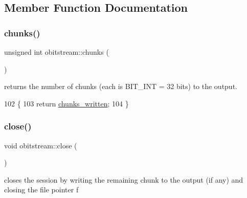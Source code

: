\subsection{Member Function Documentation}
\mbox{\label{classobitstream_ae835de27953b678b5b4ce5b33033d529}} 
\subsubsection{\texorpdfstring{chunks()}{chunks()}}
{\footnotesize\ttfamily unsigned int obitstream\+::chunks (\begin{DoxyParamCaption}{ }\end{DoxyParamCaption})\hspace{0.3cm}{\ttfamily [inline]}}



returns the number of chunks (each is B\+I\+T\+\_\+\+I\+NT = 32 bits) to the output. 


\begin{DoxyCode}
102                        \{
103     \textcolor{keywordflow}{return} \hyperlink{classobitstream_a3022397f2b6133ea5990016d9d078a2f}{chunks\_written}; 
104   \}
\end{DoxyCode}
\mbox{\label{classobitstream_a6d76dbba302e1181fbc9609072a4c2a0}} 
\subsubsection{\texorpdfstring{close()}{close()}}
{\footnotesize\ttfamily void obitstream\+::close (\begin{DoxyParamCaption}{ }\end{DoxyParamCaption})}



closes the session by writing the remaining chunk to the output (if any) and closing the file pointer f 


